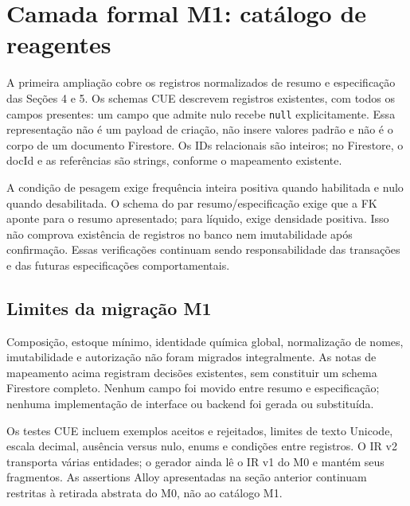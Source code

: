\clearpage
\section{Camada formal M1: catálogo de reagentes}
A primeira ampliação cobre os registros normalizados de resumo e especificação
das Seções 4 e 5. Os schemas CUE descrevem registros existentes, com todos os
campos presentes: um campo que admite nulo recebe \texttt{null} explicitamente.
Essa representação não é um payload de criação, não insere valores padrão e
não é o corpo de um documento Firestore. Os IDs relacionais são inteiros; no
Firestore, o docId e as referências são strings, conforme o mapeamento existente.

A condição de pesagem exige frequência inteira positiva quando habilitada e
nulo quando desabilitada. O schema do par resumo/especificação exige que a FK
aponte para o resumo apresentado; para líquido, exige densidade positiva.
Isso não comprova existência de registros no banco nem imutabilidade após
confirmação. Essas verificações continuam sendo responsabilidade das transações
e das futuras especificações comportamentais.




\clearpage



\subsection*{Limites da migração M1}
Composição, estoque mínimo, identidade química global, normalização de nomes,
imutabilidade e autorização não foram migrados integralmente. As notas de
mapeamento acima registram decisões existentes, sem constituir um schema
Firestore completo. Nenhum campo foi movido entre resumo e especificação;
nenhuma implementação de interface ou backend foi gerada ou substituída.

Os testes CUE incluem exemplos aceitos e rejeitados, limites de texto Unicode,
escala decimal, ausência versus nulo, enums e condições entre registros.
O IR v2 transporta várias entidades; o gerador ainda lê o IR v1 do M0 e mantém
seus fragmentos. As assertions Alloy apresentadas na seção anterior continuam
restritas à retirada abstrata do M0, não ao catálogo M1.
